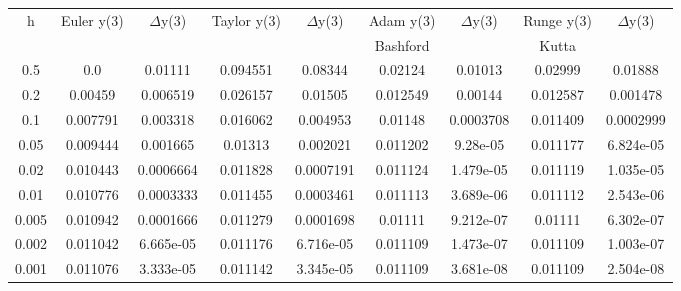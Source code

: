 \begin{center}
\begin{longtable}{|| c || c c || c c || c c || c c ||}
\hline
h & Euler y(3) & $\Delta$y(3) & Taylor y(3) & $\Delta$y(3) & Adam y(3) & $\Delta$y(3) & Runge y(3) & $\Delta$y(3) \\
 & & & & & Bashford & & Kutta & \\
\hline
0.5 & 0.0 & 0.01111 & 0.094551 & 0.08344 & 0.02124 & 0.01013 & 0.02999 & 0.01888 \\
0.2 & 0.00459 & 0.006519 & 0.026157 & 0.01505 & 0.012549 & 0.00144 & 0.012587 & 0.001478 \\
0.1 & 0.007791 & 0.003318 & 0.016062 & 0.004953 & 0.01148 & 0.0003708 & 0.011409 & 0.0002999 \\
0.05 & 0.009444 & 0.001665 & 0.01313 & 0.002021 & 0.011202 & 9.28e-05 & 0.011177 & 6.824e-05 \\
0.02 & 0.010443 & 0.0006664 & 0.011828 & 0.0007191 & 0.011124 & 1.479e-05 & 0.011119 & 1.035e-05 \\
0.01 & 0.010776 & 0.0003333 & 0.011455 & 0.0003461 & 0.011113 & 3.689e-06 & 0.011112 & 2.543e-06 \\
0.005 & 0.010942 & 0.0001666 & 0.011279 & 0.0001698 & 0.01111 & 9.212e-07 & 0.01111 & 6.302e-07 \\
0.002 & 0.011042 & 6.665e-05 & 0.011176 & 6.716e-05 & 0.011109 & 1.473e-07 & 0.011109 & 1.003e-07 \\
0.001 & 0.011076 & 3.333e-05 & 0.011142 & 3.345e-05 & 0.011109 & 3.681e-08 & 0.011109 & 2.504e-08 \\
\hline
\end{longtable}
\end{center}
